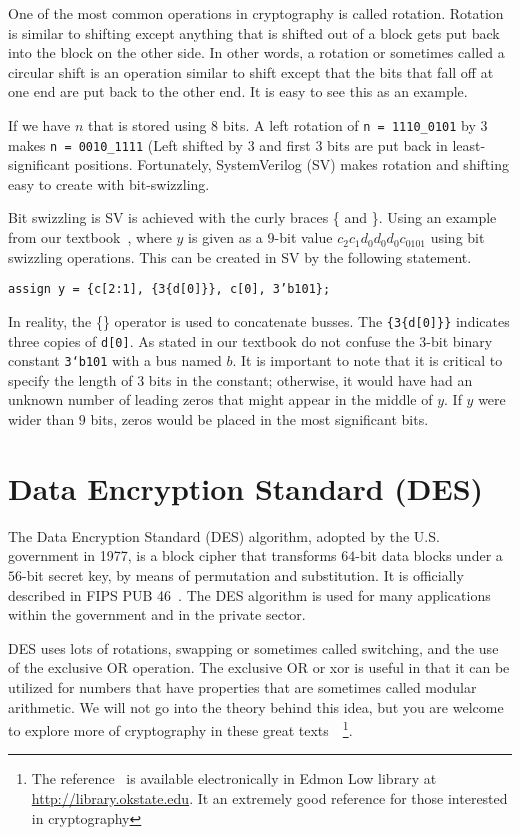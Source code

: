\documentclass{article}
\begin{document}
One of the most common operations in cryptography is called rotation.
Rotation is similar to shifting except anything that is shifted out of
a block gets put back into the block on the other side.  In other
words, a rotation or sometimes called a circular shift is an operation
similar to shift except that the bits that fall off at one end are put
back to the other end.  It is easy to see this as an example.

If we have $n$ that is stored using $8$ bits.
A left rotation of \verb!n = 1110_0101! by $3$ makes
\verb!n = 0010_1111! (Left shifted by 3 and first 3 bits are put back
in least-significant positions.  Fortunately, SystemVerilog (SV) makes
rotation and shifting easy to create with bit-swizzling.

Bit swizzling is SV is achieved with the curly braces \{ and \}.
Using an example from our textbook~\cite{ddca-riscv}, where $y$ is
given as a $9$-bit value
$c_2c_1d_0d_0d_0c_0101$ using bit swizzling operations.  This can be
created in SV by the following statement.
\begin{verbatim}
assign y = {c[2:1], {3{d[0]}}, c[0], 3’b101};
\end{verbatim}
In reality, the \{\} operator is used to concatenate busses. The
\verb!{3{d[0]}}! indicates three copies of \verb!d[0]!.
As stated in our textbook do not confuse the $3$-bit binary constant
\verb!3‘b101! with a bus named $b$.
It is important to note that it is critical to specify the length of
$3$ bits in the constant; otherwise, it would have had an unknown
number of leading zeros that might appear in the middle of $y$.
If $y$ were wider than $9$ bits, zeros would be placed in the most
significant bits.

\section{Data Encryption Standard (DES)}

The Data Encryption Standard (DES) algorithm, adopted by the U.S. 
government in 1977, is a block cipher that transforms $64$-bit data
blocks
under a $56$-bit secret key, by means of permutation and
substitution. It
is officially described in FIPS PUB 46~\cite{fips463}. The DES
algorithm is used for
many applications within the government and in the private sector.

DES uses lots of rotations, swapping or sometimes called
switching, and the use of the exclusive OR operation.
The exclusive OR
or xor 
is useful in that it can be utilized for numbers that have
properties that are sometimes called modular arithmetic.  We will not
go into the theory behind this idea, but you are welcome to explore
more of cryptography in
these great texts~\cite{10.5555/1721909,
  10.5555/2523199}~\footnote{The reference~\cite{10.5555/1721909} is available
electronically in Edmon Low library at
\url{http://library.okstate.edu}.  It an extremely good reference for
those interested in cryptography}.
\end{document}
